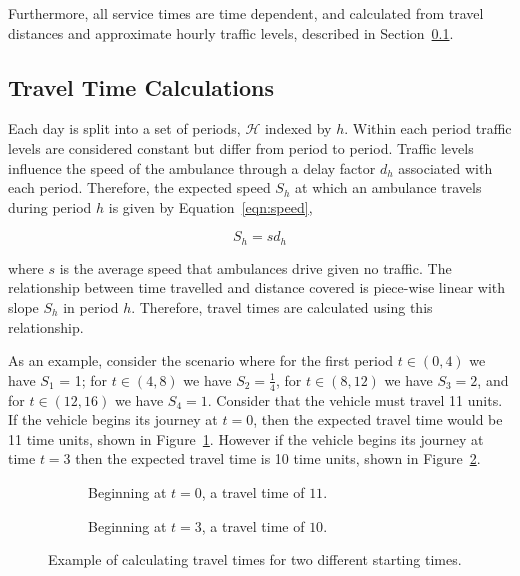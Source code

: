 \documentclass[preprint,12pt]{elsarticle}
\begin{document}
Furthermore, all service times are time dependent, and calculated from travel
distances and approximate hourly traffic levels, described in
Section~\ref{sec:travel_times}.

\subsection{Travel Time Calculations}\label{sec:travel_times}
Each day is split into a set of periods, $\mathcal{H}$ indexed by $h$. Within
each period traffic levels are considered constant but differ from period to
period. Traffic levels influence the speed of the ambulance through a delay
factor $d_h$ associated with each period. Therefore, the expected speed $S_h$
at which an ambulance travels during period $h$ is given by
Equation~\ref{eqn:speed},

\begin{equation}\label{eqn:speed}
S_h = s d_h
\end{equation}

where $s$ is the average speed that ambulances drive given no traffic. The
relationship between time travelled and distance covered is piece-wise linear
with slope $S_h$ in period $h$. Therefore, travel times are calculated using
this relationship.

As an example, consider the scenario where for the first period $t \in (0, 4)$
we have $S_1$ = 1; for $t \in (4, 8)$ we have $S_2 = \frac{1}{4}$, for
$t \in (8, 12)$ we have $S_3 = 2$, and for $t \in (12, 16)$ we have $S_4 = 1$.
Consider that the vehicle must travel 11 units. If the vehicle begins its
journey at $t=0$, then the expected travel time would be 11 time units, shown
in Figure~\ref{fig:travel_times_1}. However if the vehicle begins its journey
at time $t=3$ then the expected travel time is 10 time units, shown in
Figure~\ref{fig:travel_times_2}.

\begin{figure}
    \begin{center}
    \begin{subfigure}{6.6cm}
    
    \caption{Beginning at $t=0$, a travel time of $11$.}
    \label{fig:travel_times_1}
    \end{subfigure}
    \begin{subfigure}{6.6cm}
    
    \caption{Beginning at $t=3$, a travel time of $10$.}
    \label{fig:travel_times_2}
    \end{subfigure}
    \end{center}
    \caption{Example of calculating travel times for two different starting
    times.}
    \label{fig:travel_times}
\end{figure}
\end{document}
